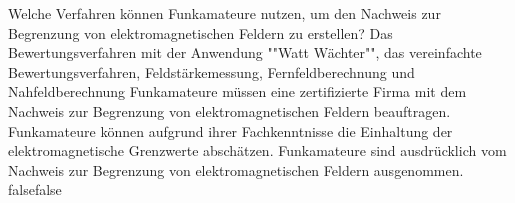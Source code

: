     {Welche Verfahren können Funkamateure nutzen, um den Nachweis zur Begrenzung von elektromagnetischen Feldern zu erstellen?}
    {Das Bewertungsverfahren mit der Anwendung ""Watt Wächter"", das vereinfachte Bewertungsverfahren, Feldstärkemessung, Fernfeldberechnung und Nahfeldberechnung}
    {Funkamateure müssen eine zertifizierte Firma mit dem Nachweis zur Begrenzung von elektromagnetischen Feldern beauftragen.}
    {Funkamateure können aufgrund ihrer Fachkenntnisse die Einhaltung der elektromagnetische Grenzwerte abschätzen.}
    {Funkamateure sind ausdrücklich vom Nachweis zur Begrenzung von elektromagnetischen Feldern ausgenommen.}
    {false}{false}